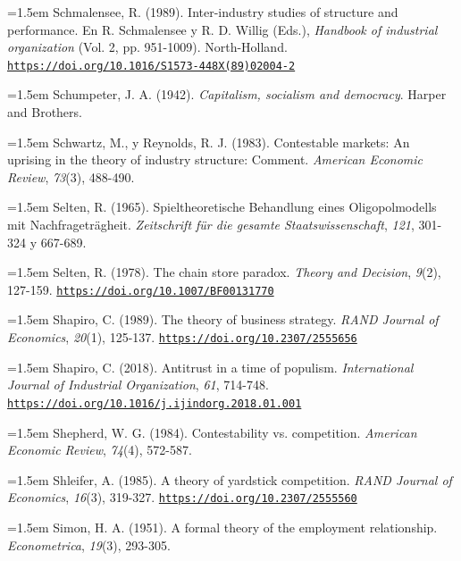 \documentclass[10pt,a4paper]{article}
\begin{document}
\noindent\hangindent=1.5em Schmalensee, R. (1989). Inter-industry studies of structure and performance. En R. Schmalensee y R. D. Willig (Eds.), \textit{Handbook of industrial organization} (Vol. 2, pp. 951-1009). North-Holland. \href{https://doi.org/10.1016/S1573-448X(89)02004-2}{\nolinkurl{https://doi.org/10.1016/S1573-448X(89)02004-2}}

\noindent\hangindent=1.5em Schumpeter, J. A. (1942). \textit{Capitalism, socialism and democracy}. Harper and Brothers.

\noindent\hangindent=1.5em Schwartz, M., y Reynolds, R. J. (1983). Contestable markets: An uprising in the theory of industry structure: Comment. \textit{American Economic Review}, \textit{73}(3), 488-490.

\noindent\hangindent=1.5em Selten, R. (1965). Spieltheoretische Behandlung eines Oligopolmodells mit Nachfrageträgheit. \textit{Zeitschrift für die gesamte Staatswissenschaft}, \textit{121}, 301-324 y 667-689.

\noindent\hangindent=1.5em Selten, R. (1978). The chain store paradox. \textit{Theory and Decision}, \textit{9}(2), 127-159. \href{https://doi.org/10.1007/BF00131770}{\nolinkurl{https://doi.org/10.1007/BF00131770}}

\noindent\hangindent=1.5em Shapiro, C. (1989). The theory of business strategy. \textit{RAND Journal of Economics}, \textit{20}(1), 125-137. \href{https://doi.org/10.2307/2555656}{\nolinkurl{https://doi.org/10.2307/2555656}}

\noindent\hangindent=1.5em Shapiro, C. (2018). Antitrust in a time of populism. \textit{International Journal of Industrial Organization}, \textit{61}, 714-748. \href{https://doi.org/10.1016/j.ijindorg.2018.01.001}{\nolinkurl{https://doi.org/10.1016/j.ijindorg.2018.01.001}}

\noindent\hangindent=1.5em Shepherd, W. G. (1984). Contestability vs. competition. \textit{American Economic Review}, \textit{74}(4), 572-587.

\noindent\hangindent=1.5em Shleifer, A. (1985). A theory of yardstick competition. \textit{RAND Journal of Economics}, \textit{16}(3), 319-327. \href{https://doi.org/10.2307/2555560}{\nolinkurl{https://doi.org/10.2307/2555560}}

\noindent\hangindent=1.5em Simon, H. A. (1951). A formal theory of the employment relationship. \textit{Econometrica}, \textit{19}(3), 293-305.
\end{document}
